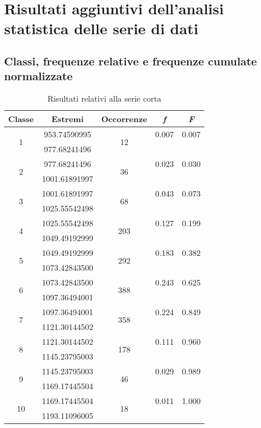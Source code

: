 \section{Risultati aggiuntivi dell'analisi statistica delle serie di dati} \label{app:statistica}


\subsection{Classi, frequenze relative e frequenze cumulate normalizzate}

\begin{table}[H]
	\centering
	\begin{tabular}{c|c|c|c|c}
		\toprule
		\toprule
		\textbf{Classe} & \textbf{Estremi} & \textbf{Occorrenze} & \textbf{\textit{f}} & \textbf{\textit{F}} \\
		\midrule
		\midrule
		\multirow{2}{*}{1} & 953.74590995 & \multirow{2}{*}{12} & 0.007 & 0.007 \\
		& 977.68241496 & & & \\
		\midrule
		\multirow{2}{*}{2} & 977.68241496 & \multirow{2}{*}{36} & 0.023 & 0.030 \\
		&  1001.61891997& & & \\
		\midrule
		\multirow{2}{*}{3} & 1001.61891997 & \multirow{2}{*}{68} & 0.043 & 0.073 \\
		&  1025.55542498  & & & \\
		\midrule
		\multirow{2}{*}{4} & 1025.55542498 & \multirow{2}{*}{203} & 0.127 & 0.199 \\
		&1049.49192999& & & \\
		\midrule
		\multirow{2}{*}{5} & 1049.49192999 & \multirow{2}{*}{292} & 0.183 & 0.382 \\
		&  1073.42843500  & & & \\
		\midrule
		\multirow{2}{*}{6} & 1073.42843500 & \multirow{2}{*}{388} & 0.243 & 0.625 \\
		&  1097.36494001 & & & \\
		\midrule
		\multirow{2}{*}{7} & 1097.36494001 & \multirow{2}{*}{358} & 0.224 & 0.849 \\
		& 1121.30144502 & & & \\
		\midrule
		\multirow{2}{*}{8} & 1121.30144502 & \multirow{2}{*}{178} & 0.111 & 0.960 \\
		& 1145.23795003  & & & \\
		\midrule
		\multirow{2}{*}{9} & 1145.23795003 & \multirow{2}{*}{46} & 0.029 & 0.989 \\
		& 1169.17445504& & & \\
		\midrule
		\multirow{2}{*}{10} & 1169.17445504 & \multirow{2}{*}{18} & 0.011 & 1.000 \\
		& 1193.11096005 & & & \\
		\bottomrule
		\bottomrule
	\end{tabular}
	\caption{Risultati relativi alla serie corta}
	\label{tab:seriecorta}
\end{table}









